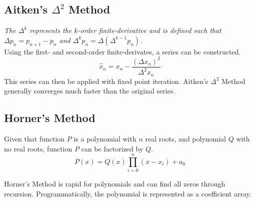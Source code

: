 \documentclass[10pt]{article}
\numberwithin{equation}{subsection}
\numberwithin{equation}{subsection}
\begin{document}
            

        \subsection{Aitken's $\Delta^2$ Method}

            \textit{The $\Delta^k$ represents the $k$-order finite-derivative and is
            defined such that $\Delta p_n = p_{n+1} - p_{n}$ and
            $\Delta^k p_n = \Delta (\Delta^{k-1} p_n)$.}\\

            Using the first- and second-order finite-derivates, a series can be
            constructed.
            $$\hat{x}_n = x_n - \frac{(\Delta x_n)^2}{\Delta^2 x_n}$$
            This series can then be applied with fixed point iteration.
            Aitken's $\Delta^2$ Method generally converges much faster than the original
            series.

        \subsection{Horner's Method}

            Given that function $P$ is a polynomial with $n$ real roots,
            and polynomial $Q$ with no real roots, function $P$ can be
            factorized by $Q$.
            $$P(x) = Q(x) \prod_{i=0}^{n} (x - x_i) + a_0$$

            Horner's Method is rapid for polynomials and can find all zeros
            through recursion. Programmatically, the polynomial is represented
            as a coefficient array.
\end{document}
